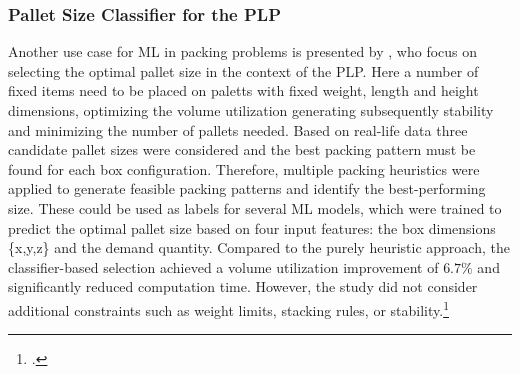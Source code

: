\subsubsection{Pallet Size Classifier for the \gls{PLP}}
Another use case for \gls{ML} in packing problems is presented by \citeauthor*{aylak_application_2021},
who focus on selecting the optimal pallet size in the context of the \gls{PLP}. Here a number of fixed items
need to be placed on paletts with fixed weight, length and height dimensions, optimizing the volume utilization
generating subsequently stability and minimizing the number of pallets needed. Based on real-life data
three candidate pallet sizes were considered and the best packing pattern must be found for each box
configuration. Therefore, multiple packing heuristics were applied to
generate feasible packing patterns and identify the best-performing size. These could be used as labels for several
\gls{ML} models, which were trained to predict the optimal pallet size based on four input features: the box
dimensions \{x,y,z\} and the demand quantity. Compared to the purely heuristic approach, the classifier-based
selection achieved a volume utilization improvement of $6.7\%$ and significantly reduced computation time.
However, the study did not consider additional constraints such as weight limits, stacking rules, or stability.\footcite[cf.][pp. 12--14]{aylak_application_2021}

\parbreak

